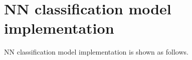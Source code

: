 \chapter{NN classification model implementation}
NN classification model implementation is shown as follows.\\

